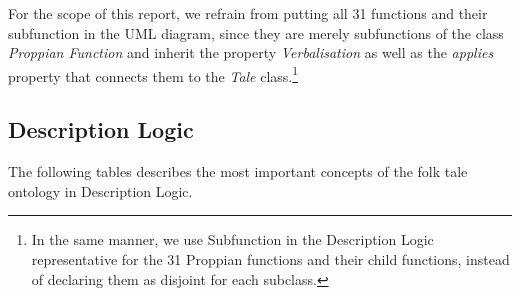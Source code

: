 \documentclass[10pt,a4paper]{article}
\begin{document}
For the scope of this report, we refrain from putting all 31 functions and their subfunction in the UML diagram, since they are merely subfunctions of the class \textit{Proppian Function} and inherit the property \textit{Verbalisation} as well as the \textit{applies} property that connects them to the \textit{Tale} class.\footnote{In the same manner, we use Subfunction in the Description Logic representative for the 31 Proppian functions and their child functions, instead of declaring them as disjoint for each subclass.}  

\subsection{Description Logic}

The following tables describes the most important concepts of the folk tale ontology in Description Logic.
\\
\small
\end{document}
